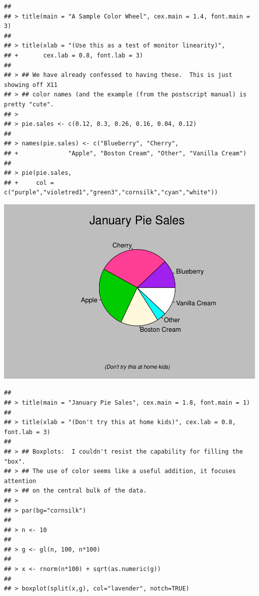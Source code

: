 \documentclass[
]{book}
\begin{document}
\begin{verbatim}
## 
## > title(main = "A Sample Color Wheel", cex.main = 1.4, font.main = 3)
## 
## > title(xlab = "(Use this as a test of monitor linearity)",
## +       cex.lab = 0.8, font.lab = 3)
## 
## > ## We have already confessed to having these.  This is just showing off X11
## > ## color names (and the example (from the postscript manual) is pretty "cute".
## > 
## > pie.sales <- c(0.12, 0.3, 0.26, 0.16, 0.04, 0.12)
## 
## > names(pie.sales) <- c("Blueberry", "Cherry",
## +              "Apple", "Boston Cream", "Other", "Vanilla Cream")
## 
## > pie(pie.sales,
## +     col = c("purple","violetred1","green3","cornsilk","cyan","white"))
\end{verbatim}

\includegraphics{bookdown-demo_files/figure-latex/unnamed-chunk-6-3.pdf}

\begin{verbatim}
## 
## > title(main = "January Pie Sales", cex.main = 1.8, font.main = 1)
## 
## > title(xlab = "(Don't try this at home kids)", cex.lab = 0.8, font.lab = 3)
## 
## > ## Boxplots:  I couldn't resist the capability for filling the "box".
## > ## The use of color seems like a useful addition, it focuses attention
## > ## on the central bulk of the data.
## > 
## > par(bg="cornsilk")
## 
## > n <- 10
## 
## > g <- gl(n, 100, n*100)
## 
## > x <- rnorm(n*100) + sqrt(as.numeric(g))
## 
## > boxplot(split(x,g), col="lavender", notch=TRUE)
\end{verbatim}
\end{document}
